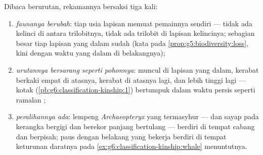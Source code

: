 \begin{proposition}\label{prop:g9:evidence-of-evolution:record}
Dibaca berurutan, rekamannya bersaksi tiga kali:
\begin{enumerate}
  \item \emph{faunanya berubah}: tiap usia lapisan memuat
        pemainnya sendiri --- tidak ada kelinci di antara
        trilobitnya, tidak ada trilobit di lapisan
        kelincinya; sebagian besar  tiap lapisan yang
        dalam sudah \emph{} (kata pada
        \cref{prop:g5:biodiversity:loss}, kini dengan waktu
        yang dalam di belakangnya);
  \item \emph{urutannya bersarang seperti pohonnya}: 
        muncul di lapisan yang dalam, kerabat  berkaki
        empat di atasnya, kerabat  di atasnya lagi,
         dan  lebih tinggi lagi --- kotak
         (\cref{pb:g6:classification-kinship:1})
        bertumpuk dalam waktu persis seperti ramalan
        ;
  \item \emph{peralihannya ada}: lempeng
        \emph{Archaeopteryx} yang termasyhur --- 
        dan sayap pada kerangka  bergigi dan berekor
        panjang bertulang --- berdiri di tempat cabang 
        dan  berpisah;  paus dengan 
        belakang yang bekerja berdiri di tempat keturunan
         daratnya pada
        \cref{ex:g6:classification-kinship:whale} menuntutnya.
\end{enumerate}
\end{proposition}
\admitted

